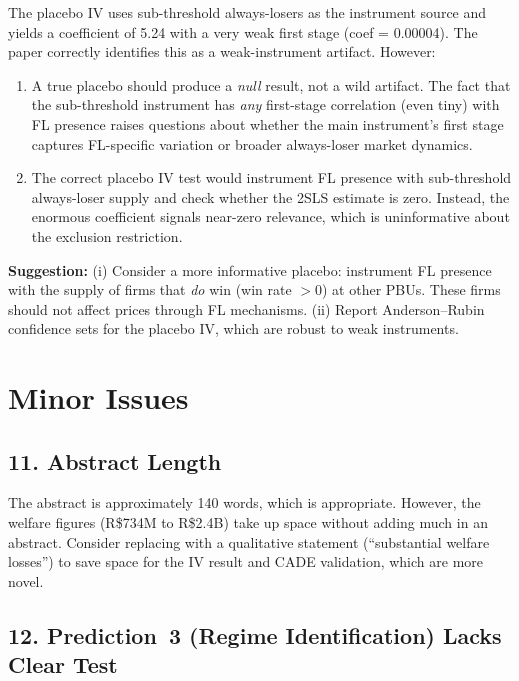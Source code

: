 \documentclass[12pt]{article}
\begin{document}
The placebo IV uses sub-threshold always-losers as the instrument source
and yields a coefficient of 5.24 with a very weak first stage (coef =
0.00004). The paper correctly identifies this as a weak-instrument
artifact. However:

\begin{enumerate}[]
  \item A true placebo should produce a \emph{null} result, not a
    wild artifact. The fact that the sub-threshold instrument has
    \emph{any} first-stage correlation (even tiny) with FL presence
    raises questions about whether the main instrument's first stage
    captures FL-specific variation or broader always-loser market
    dynamics.

  \item The correct placebo IV test would instrument FL presence with
    sub-threshold always-loser supply and check whether the 2SLS
    estimate is zero. Instead, the enormous coefficient signals
    near-zero relevance, which is uninformative about the exclusion
    restriction.
\end{enumerate}

\noindent\textbf{Suggestion:} (i) Consider a more informative placebo:
instrument FL presence with the supply of firms that \emph{do} win
(win rate $> 0$) at other PBUs. These firms should not affect prices
through FL mechanisms. (ii) Report Anderson--Rubin confidence sets for
the placebo IV, which are robust to weak instruments.


\section*{Minor Issues}

\subsection*{11. Abstract Length}

The abstract is approximately 140 words, which is appropriate. However,
the welfare figures (R\$734M to R\$2.4B) take up space without adding
much in an abstract. Consider replacing with a qualitative statement
(``substantial welfare losses'') to save space for the IV result and
CADE validation, which are more novel.

\subsection*{12. Prediction~3 (Regime Identification) Lacks Clear Test}
\end{document}
